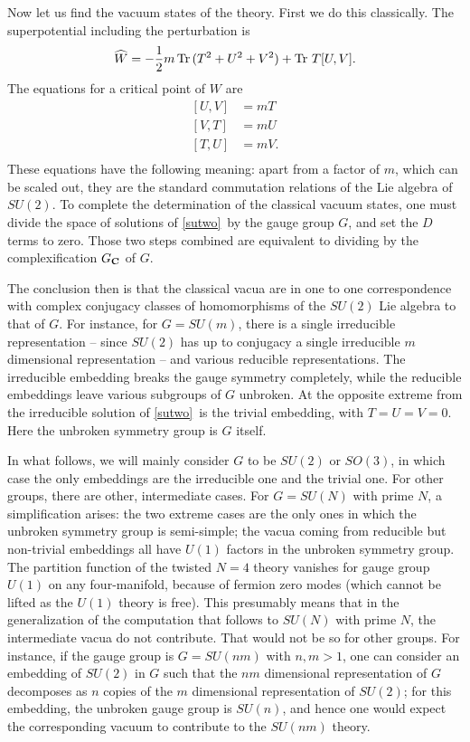 \documentclass[12pt]{article}
\numberwithin{equation}{section}
\DeclareMathOperator{\Tr}{Tr}
\begin{document}
Now let us find the vacuum states of the theory.  First we do this classically.
The superpotential including the perturbation is
\begin{equation}
  \label{what}
  \widehat W = - {1\over 2}m\Tr\,(T^2+U^2+V^2)+\Tr\, T[U,V].
\end{equation}
The equations for a critical point of $W$ are
\begin{equation}
  \label{sutwo}
  \begin{aligned} [U,V] & = m T\\ [V,T] & = m U \\ [T,U] & = m V .\\
  \end{aligned}
\end{equation}
These equations have the following meaning: apart from a factor
of $m$, which can be scaled out, they are the standard commutation
relations of the Lie algebra of $SU(2)$.  To complete the determination
of the classical vacuum states, one must divide the space of solutions
of \eqref{sutwo}\ by the gauge group $G$, and set the $D$ terms to zero.
Those two steps combined are equivalent to dividing by the complexification
$G_{{\bf C}}$ of $G$.

The conclusion then is that the classical vacua are in one to one
correspondence with complex conjugacy classes of homomorphisms
of the $SU(2)$ Lie algebra to that of $G$.  For instance, for $G=SU(m)$,
there is a single irreducible representation -- since
$SU(2)$ has up to conjugacy a single irreducible $m$ dimensional
representation -- and various reducible representations.  The irreducible
embedding breaks the gauge symmetry completely, while the reducible
embeddings leave various subgroups of $G$ unbroken.
At the opposite extreme from the irreducible solution
of \eqref{sutwo}\ is the trivial embedding, with $T=U=V=0$.  Here the unbroken
symmetry group is $G$ itself.

In what follows, we will mainly consider $G$ to be $SU(2)$ or $SO(3)$,
in which case the
only embeddings are the irreducible one and the trivial one.
For other groups, there are other, intermediate cases.  For $G=SU(N)$ with
prime $N$, a simplification arises:
the two extreme cases are the only
ones in which the
unbroken symmetry group is semi-simple; the vacua coming from
reducible but non-trivial embeddings all have
$U(1)$ factors in the unbroken symmetry group.
The partition function of the twisted $N=4$ theory vanishes for gauge
group $U(1)$ on any four-manifold, because of fermion zero modes
(which cannot be lifted as the $U(1)$ theory is free).  This
presumably means that in the
generalization of the computation that follows to $SU(N)$ with
prime $N$, the intermediate
vacua do not contribute.  That would not be so for other groups.
For instance, if the gauge group is $G=SU(nm)$ with $n,m>1$, one can consider
an embedding of $SU(2)$ in $G$ such that the $nm$ dimensional representation
of $G$ decomposes as $n$ copies of the $m$ dimensional representation
of $SU(2)$; for this embedding, the unbroken gauge group is $SU(n)$,
and hence one  would expect the corresponding vacuum to contribute
to the $SU(nm)$ theory.
\end{document}
